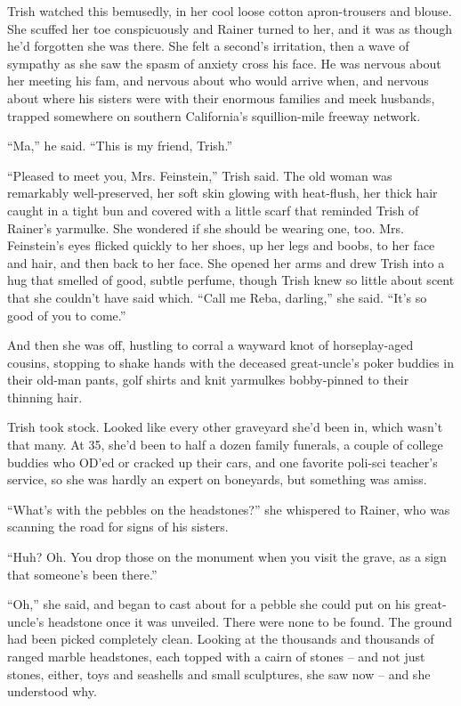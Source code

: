 Trish watched this bemusedly, in her cool loose cotton apron-trousers 
and blouse. She scuffed her toe conspicuously and Rainer turned to her, 
and it was as though he'd forgotten she was there. She felt a second's 
irritation, then a wave of sympathy as she saw the spasm of anxiety 
cross his face. He was nervous about her meeting his fam, and nervous 
about who would arrive when, and nervous about where his sisters were 
with their enormous families and meek husbands, trapped somewhere on 
southern California's squillion-mile freeway network.

“Ma,” he said. “This is my friend, Trish.”

“Pleased to meet you, Mrs. Feinstein,” Trish said. The old woman 
was remarkably well-preserved, her soft skin glowing with heat-flush, 
her thick hair caught in a tight bun and covered with a little scarf 
that reminded Trish of Rainer's yarmulke. She wondered if she should be 
wearing one, too. Mrs. Feinstein's eyes flicked quickly to her shoes, 
up her legs and boobs, to her face and hair, and then back to her face. 
She opened her arms and drew Trish into a hug that smelled of good, 
subtle perfume, though Trish knew so little about scent that she 
couldn't have said which. “Call me Reba, darling,” she said. 
“It's so good of you to come.”

And then she was off, hustling to corral a wayward knot of 
horseplay-aged cousins, stopping to shake hands with the deceased 
great-uncle's poker buddies in their old-man pants, golf shirts and 
knit yarmulkes bobby-pinned to their thinning hair.

Trish took stock. Looked like every other graveyard she'd been in, 
which wasn't that many. At 35, she'd been to half a dozen family 
funerals, a couple of college buddies who OD'ed or cracked up their 
cars, and one favorite poli-sci teacher's service, so she was hardly an 
expert on boneyards, but something was amiss.

“What's with the pebbles on the headstones?” she whispered to 
Rainer, who was scanning the road for signs of his sisters.

“Huh? Oh. You drop those on the monument when you visit the grave, as 
a sign that someone's been there.”

“Oh,” she said, and began to cast about for a pebble she could put 
on his great-uncle's headstone once it was unveiled. There were none to 
be found. The ground had been picked completely clean. Looking at the 
thousands and thousands of ranged marble headstones, each topped with a 
cairn of stones -- and not just stones, either, toys and seashells and 
small sculptures, she saw now -- and she understood why.

